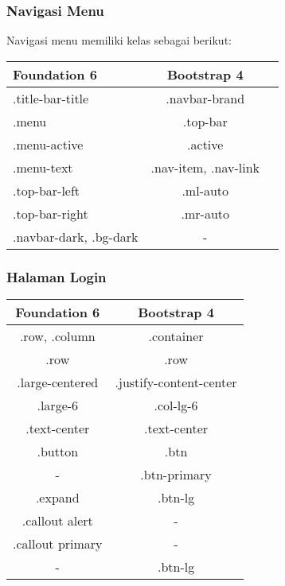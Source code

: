 \subsubsection{Navigasi Menu}
Navigasi menu memiliki kelas sebagai berikut: \noindent
\begin{tabular}{l||c|c||} 
	\hline
	\textbf{Foundation 6} & \textbf{Bootstrap 4}  \\ [0.5ex] 
	\hline\hline
	.title-bar-title & .navbar-brand  \\ 
	\hline
	.menu & .top-bar  \\
	\hline
	.menu-active & .active  \\
	\hline	
	.menu-text & .nav-item, .nav-link \\
	\hline	
	.top-bar-left & .ml-auto  \\
	\hline
	.top-bar-right & .mr-auto  \\
	\hline
	.navbar-dark, .bg-dark & -  \\ [1ex] 
	\hline
\end{tabular}
\subsubsection{Halaman Login}
\begin{tabular}{||c|c||} 
	\hline
	\textbf{Foundation 6} & \textbf{Bootstrap 4}  \\ [0.5ex] 
	\hline\hline
	.row, .column &.container    \\ 
	\hline	
	.row &.row     \\  
	\hline
	 .large-centered &.justify-content-center \\  
	 \hline
	 .large-6 &.col-lg-6    \\ 
	 \hline
	 .text-center & .text-center   \\ 
	 \hline
	 .button & .btn   \\ 
	 \hline
	 - & .btn-primary   \\ 
	\hline
	.expand & .btn-lg  \\ 
	\hline
	.callout alert & -  \\ 
	\hline
	.callout primary & -  \\ 
	\hline
	- & .btn-lg   \\ [1ex] 
	\hline
\end{tabular}

